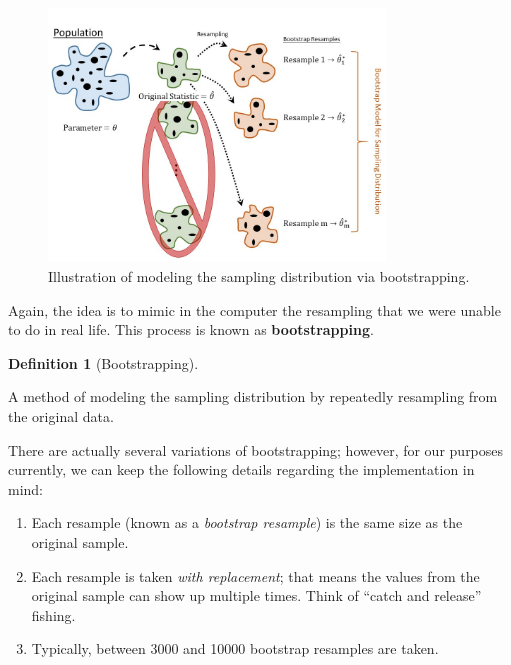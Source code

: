 \documentclass[
  letterpaper,
  DIV=11,
  numbers=noendperiod]{scrreprt}
\providecommand{\tightlist}{%
  \setlength{\itemsep}{0pt}\setlength{\parskip}{0pt}}\usepackage{longtable,booktabs,array}
\theoremstyle{plain}
\theoremstyle{definition}
\theoremstyle{definition}
\newtheorem{definition}{Definition}[chapter]
\theoremstyle{remark}
\begin{document}
\begin{figure}

{\centering \includegraphics[width=0.8\textwidth,height=\textheight]{./images/SamplingDistns-Bootstrap.jpg}

}

\caption{\label{fig-samplingdistns-bootstrap}Illustration of modeling
the sampling distribution via bootstrapping.}

\end{figure}

Again, the idea is to mimic in the computer the resampling that we were
unable to do in real life. This process is known as
\textbf{bootstrapping}.

\begin{definition}[Bootstrapping]\protect\hypertarget{def-bootstrap}{}\label{def-bootstrap}

A method of modeling the sampling distribution by repeatedly resampling
from the original data.

\end{definition}

There are actually several variations of bootstrapping; however, for our
purposes currently, we can keep the following details regarding the
implementation in mind:

\begin{enumerate}
\def\labelenumi{\arabic{enumi}.}
\tightlist
\item
  Each resample (known as a \emph{bootstrap resample}) is the same size
  as the original sample.
\item
  Each resample is taken \emph{with replacement}; that means the values
  from the original sample can show up multiple times. Think of ``catch
  and release'' fishing.
\item
  Typically, between 3000 and 10000 bootstrap resamples are taken.
\end{enumerate}
\end{document}
